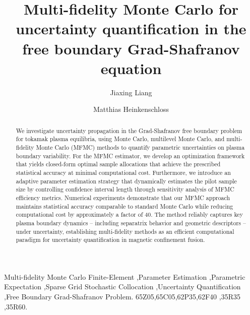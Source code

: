 \documentclass[final,3p,times,11pt]{elsarticle}
\begin{document}
\begin{frontmatter}
\title{Multi-fidelity Monte Carlo for uncertainty quantification in the free boundary Grad-Shafranov equation}

\author[riceJL]{Jiaxing Liang}
\address[riceJL]{Department of Computational Applied Mathematics \& Operations Research, Rice University.}
\author[riceMH]{Matthias Heinkenschloss}
\address[riceMH]{Department of Computational Applied Mathematics \& Operations Research and The Ken Kennedy Institute, Rice  University.}

\begin{abstract}
We investigate uncertainty propagation in the Grad-Shafranov free boundary problem for tokamak plasma equilibria, using Monte Carlo, multilevel Monte Carlo, and multi-fidelity Monte Carlo (MFMC) methods to quantify parametric uncertainties on plasma boundary variability. For the MFMC estimator, we develop an optimization framework that yields closed-form optimal sample allocations that achieve the prescribed statistical accuracy at minimal computational cost. Furthermore, we introduce an adaptive parameter estimation strategy that dynamically estimates the pilot sample size by controlling confidence interval length through sensitivity analysis of MFMC efficiency metrics. Numerical experiments demonstrate that our MFMC approach maintains statistical accuracy comparable to standard Monte Carlo while reducing computational cost by approximately a factor of 40. The method reliably captures key plasma boundary dynamics -- including separatrix behavior and geometric descriptors -- under uncertainty, establishing multi-fidelity methods as an efficient computational paradigm for uncertainty quantification in magnetic confinement fusion.  
\end{abstract}

\begin{keyword}
Multi-fidelity Monte Carlo Finite-Element \sep Parameter Estimation \sep Parametric Expectation \sep Sparse Grid Stochastic Collocation \sep Uncertainty Quantification \sep Free Boundary Grad-Shafranov Problem.
%
\MSC[2020] 65Z05\sep 65C05\sep 62P35\sep 62F40 \sep 35R35 \sep 35R60.
\end{keyword}
\end{frontmatter}

 
 












% 

\end{document}
